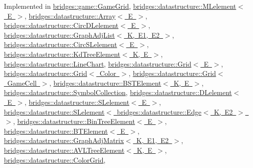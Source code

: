Implemented in \mbox{\hyperlink{classbridges_1_1game_1_1_game_grid_a07da19700a077e3d0f2cde2cade2ba60}{bridges\+::game\+::\+Game\+Grid}}, \mbox{\hyperlink{classbridges_1_1datastructure_1_1_m_lelement_a735c3cb43648b4d4e7d3316cdc1a1952}{bridges\+::datastructure\+::\+M\+Lelement$<$ E $>$}}, \mbox{\hyperlink{classbridges_1_1datastructure_1_1_array_a3b6d694fe5d336a0a15951d522852e51}{bridges\+::datastructure\+::\+Array$<$ E $>$}}, \mbox{\hyperlink{classbridges_1_1datastructure_1_1_circ_d_lelement_aec7f9b9dc6626c1a872feb91cd65425d}{bridges\+::datastructure\+::\+Circ\+D\+Lelement$<$ E $>$}}, \mbox{\hyperlink{classbridges_1_1datastructure_1_1_graph_adj_list_adf1bfde5ec7192f3ee334695059f8fa6}{bridges\+::datastructure\+::\+Graph\+Adj\+List$<$ K, E1, E2 $>$}}, \mbox{\hyperlink{classbridges_1_1datastructure_1_1_circ_s_lelement_a775ba08a7811fe91c396cb27ba9343ab}{bridges\+::datastructure\+::\+Circ\+S\+Lelement$<$ E $>$}}, \mbox{\hyperlink{classbridges_1_1datastructure_1_1_kd_tree_element_a76f6d9bfadfdec09d0a8564aa0e33235}{bridges\+::datastructure\+::\+Kd\+Tree\+Element$<$ K, E $>$}}, \mbox{\hyperlink{classbridges_1_1datastructure_1_1_line_chart_a431e49c31cdd5f46e978742776306dfa}{bridges\+::datastructure\+::\+Line\+Chart}}, \mbox{\hyperlink{classbridges_1_1datastructure_1_1_grid_a16aeae38446b96f440dea15f2b19334d}{bridges\+::datastructure\+::\+Grid$<$ E $>$}}, \mbox{\hyperlink{classbridges_1_1datastructure_1_1_grid_a16aeae38446b96f440dea15f2b19334d}{bridges\+::datastructure\+::\+Grid$<$ Color $>$}}, \mbox{\hyperlink{classbridges_1_1datastructure_1_1_grid_a16aeae38446b96f440dea15f2b19334d}{bridges\+::datastructure\+::\+Grid$<$ Game\+Cell $>$}}, \mbox{\hyperlink{classbridges_1_1datastructure_1_1_b_s_t_element_a2bb8cc9ec4b6bc5b89ecef0f17be366f}{bridges\+::datastructure\+::\+B\+S\+T\+Element$<$ K, E $>$}}, \mbox{\hyperlink{classbridges_1_1datastructure_1_1_symbol_collection_a8f63c31a48a12127978967b706fc38f5}{bridges\+::datastructure\+::\+Symbol\+Collection}}, \mbox{\hyperlink{classbridges_1_1datastructure_1_1_d_lelement_a736ba8e6901608fb0ab04d781d2cceee}{bridges\+::datastructure\+::\+D\+Lelement$<$ E $>$}}, \mbox{\hyperlink{classbridges_1_1datastructure_1_1_s_lelement_a602156aacacd73d1faa365d68d8af31b}{bridges\+::datastructure\+::\+S\+Lelement$<$ E $>$}}, \mbox{\hyperlink{classbridges_1_1datastructure_1_1_s_lelement_a602156aacacd73d1faa365d68d8af31b}{bridges\+::datastructure\+::\+S\+Lelement$<$ bridges\+::datastructure\+::\+Edge$<$ K, E2 $>$ $>$}}, \mbox{\hyperlink{classbridges_1_1datastructure_1_1_bin_tree_element_aef86e3663785972251547e409fdc757b}{bridges\+::datastructure\+::\+Bin\+Tree\+Element$<$ E $>$}}, \mbox{\hyperlink{classbridges_1_1datastructure_1_1_b_t_element_a2118b6b74f3fe0fec39e3b258a7dee89}{bridges\+::datastructure\+::\+B\+T\+Element$<$ E $>$}}, \mbox{\hyperlink{classbridges_1_1datastructure_1_1_graph_adj_matrix_a2f8c67da1078354156fc646097152c6d}{bridges\+::datastructure\+::\+Graph\+Adj\+Matrix$<$ K, E1, E2 $>$}}, \mbox{\hyperlink{classbridges_1_1datastructure_1_1_a_v_l_tree_element_ab04d1e9ad4630e408041e8137dc9854a}{bridges\+::datastructure\+::\+A\+V\+L\+Tree\+Element$<$ K, E $>$}}, \mbox{\hyperlink{classbridges_1_1datastructure_1_1_color_grid_afad945d648b427ca183a1dface8249b7}{bridges\+::datastructure\+::\+Color\+Grid}}, 